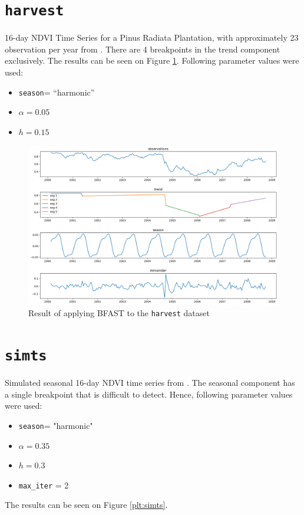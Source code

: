 \documentclass[main.tex]{subfiles}
\begin{document}
\section{\texttt{harvest}}
\label{sec:val_harvest}
16-day NDVI Time Series for a Pinus Radiata Plantation, with approximately 23
observation per year from \cite{bfast}. There are 4 breakpoints in the trend
component exclusively. The results can be seen on Figure \ref{plt:harvest}.
Following parameter values were used:
\begin{itemize}
\item \texttt{season}= ``harmonic''
\item $\alpha = 0.05$
\item $h = 0.15$
\end{itemize}

\begin{figure}
  \centering
  \includegraphics[width=\textwidth]{imgs/harvest.png}
  \caption{Result of applying BFAST to the \texttt{harvest} dataset}
  \label{plt:harvest}
\end{figure}

\section{\texttt{simts}}
\label{sec:val_simts}
Simulated seasonal 16-day NDVI time series from \cite{bfast}. The seasonal
component has a single breakpoint that is difficult to detect. Hence, following
parameter values were used:
\begin{itemize}
\item \texttt{season}= "harmonic"
\item $\alpha = 0.35$
\item $h = 0.3$
\item \texttt{max\_iter} = 2
\end{itemize}
The results can be seen on Figure \ref{plt:simts}.
\end{document}
